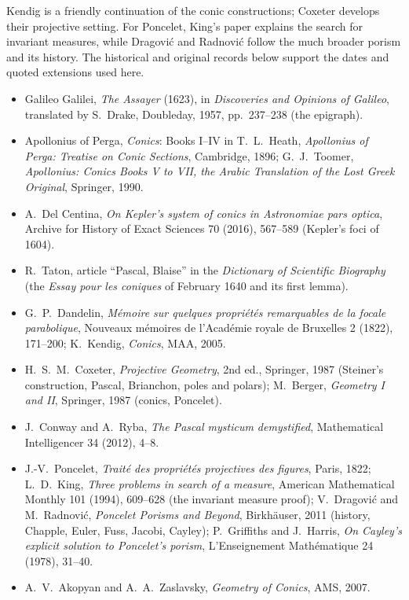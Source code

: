 Kendig is a friendly continuation of the conic constructions; Coxeter develops their projective setting. For Poncelet, King's paper explains the search for invariant measures, while Dragovi\'c and Radnovi\'c follow the much broader porism and its history. The historical and original records below support the dates and quoted extensions used here.

\begin{itemize}
\item Galileo Galilei, \emph{The Assayer} (1623), in \emph{Discoveries and Opinions of Galileo}, translated by S.~Drake, Doubleday, 1957, pp.~237--238
(the epigraph).
\item Apollonius of Perga, \emph{Conics}: Books I--IV in T.~L.~Heath, \emph{Apollonius of Perga: Treatise on Conic Sections}, Cambridge, 1896;
G.~J.~Toomer, \emph{Apollonius: Conics Books V to VII, the Arabic Translation of the Lost Greek Original}, Springer, 1990.
\item A.~Del Centina, \emph{On Kepler's system of conics in Astronomiae pars optica}, Archive for History of Exact Sciences 70 (2016), 567--589 (Kepler's
foci of 1604).
\item R.~Taton, article ``Pascal, Blaise'' in the \emph{Dictionary of Scientific Biography} (the \emph{Essay pour les coniques} of February 1640 and its
first lemma).
\item G.~P.~Dandelin, \emph{M\'emoire sur quelques propri\'et\'es remarquables de la focale parabolique}, Nouveaux m\'emoires de l'Acad\'emie royale de
Bruxelles 2 (1822), 171--200; K.~Kendig, \emph{Conics}, MAA, 2005.
\item H.~S.~M.~Coxeter, \emph{Projective Geometry}, 2nd ed., Springer, 1987 (Steiner's construction, Pascal, Brianchon, poles and polars);
M.~Berger, \emph{Geometry I and II}, Springer, 1987 (conics, Poncelet).
\item J.~Conway and A.~Ryba, \emph{The Pascal mysticum demystified}, Mathematical Intelligencer 34 (2012), 4--8.
\item J.-V.~Poncelet, \emph{Trait\'e des propri\'et\'es projectives des figures}, Paris, 1822; L.~D.~King, \emph{Three problems in search of a
measure}, American Mathematical Monthly 101 (1994), 609--628 (the invariant measure proof); V.~Dragovi\'c and M.~Radnovi\'c, \emph{Poncelet Porisms and
Beyond}, Birkh\"auser, 2011 (history, Chapple, Euler, Fuss, Jacobi, Cayley); P.~Griffiths and J.~Harris, \emph{On Cayley's explicit solution to
Poncelet's porism}, L'Enseignement Math\'ematique 24 (1978), 31--40.
\item A.~V.~Akopyan and A.~A.~Zaslavsky, \emph{Geometry of Conics}, AMS, 2007.
\end{itemize}
